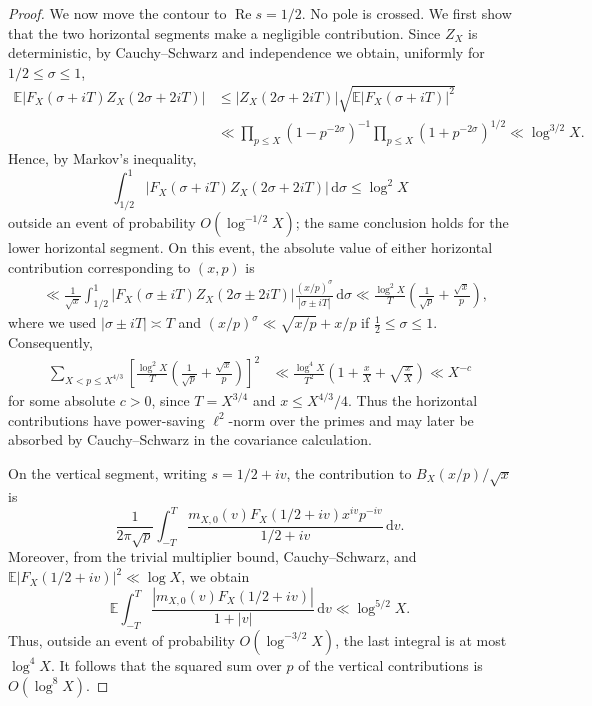 \documentclass[a4paper,12pt,reqno]{amsart}
\numberwithin{equation}{section}
\theoremstyle{remark}
\newcommand{\E}{\mathbb{E}}
\begin{document}
\begin{proof}

We now move the contour to $\operatorname{Re}s=1/2$. No pole is crossed.
We first show that the two horizontal segments make a negligible
contribution. Since $Z_X$ is deterministic, by Cauchy--Schwarz and
independence we obtain, uniformly for $1/2\leq\sigma\leq1$,
\[
 \begin{aligned}
 \E|F_X(\sigma+iT)Z_X(2\sigma+2iT)|
 &\leq |Z_X(2\sigma+2iT)|
 \sqrt{\E|F_X(\sigma+iT)|^2}\\
 &\ll
 \prod_{p\leq X}(1-p^{-2\sigma})^{-1}
 \prod_{p\leq X}(1+p^{-2\sigma})^{1/2}
 \ll \log^{3/2}X.
 \end{aligned}
\]
Hence, by Markov's inequality,
\[
 \int_{1/2}^1
 |F_X(\sigma+iT)Z_X(2\sigma+2iT)|\,\mathrm{d}\sigma
 \leq\log^2X
\]
outside an event of probability $O(\log^{-1/2}X)$; the same conclusion
holds for the lower horizontal segment.
On this event, the absolute value of either horizontal contribution
corresponding to $(x,p)$ is
\[
 \begin{aligned}
 &\ll \frac1{\sqrt x}
 \int_{1/2}^1
 |F_X(\sigma\pm iT)Z_X(2\sigma\pm2iT)|
 \frac{(x/p)^\sigma}{|\sigma\pm iT|}
 \,\mathrm{d}\sigma\ll \frac{\log^2X}{T}
 \left(\frac1{\sqrt p}+\frac{\sqrt x}{p}\right),
 \end{aligned}
\]
where we used $|\sigma\pm iT|\asymp T$ and
\(
 \left({x}/{p}\right)^\sigma
 \ll \sqrt{x/p}+x/p \) if \(\frac12\leq\sigma\leq1.
\)
Consequently,
\[
 \begin{aligned}
 \sum_{X<p\leq X^{4/3}}
 \left[
 \frac{\log^2X}{T}
 \left(\frac1{\sqrt p}+\frac{\sqrt x}{p}\right)
 \right]^2
 &\ll
 \frac{\log^4X}{T^2}
 \left(1+\frac{x}{X}+\sqrt{\frac{x}{X}}\right)\ll X^{-c}
 \end{aligned}
\]
for some absolute $c>0$, since $T=X^{3/4}$ and
$x\leq X^{4/3}/4$. Thus the horizontal contributions have
power-saving $\ell^2$-norm over the primes and may later be absorbed by
Cauchy--Schwarz in the covariance calculation.

On the vertical segment, writing $s=1/2+iv$, the contribution to
$B_X(x/p)/\sqrt x$ is
\[
 \frac1{2\pi\sqrt p}
 \int_{-T}^{T}
 \frac{m_{X,0}(v)F_X(1/2+iv)x^{iv}p^{-iv}}
 {1/2+iv}\,\mathrm{d}v.
\]
Moreover, from the trivial multiplier bound, Cauchy--Schwarz, and
$\E|F_X(1/2+iv)|^2\ll\log X$, we obtain
\[
 \E\int_{-T}^{T}
 \frac{|m_{X,0}(v)F_X(1/2+iv)|}{1+|v|}\,\mathrm{d}v
 \ll\log^{5/2}X.
\]
Thus, outside an event of probability $O(\log^{-3/2}X)$, the last integral
is at most $\log^4X$. It follows that the squared sum over $p$ of the
vertical contributions is $O(\log^8X)$.


\end{proof}
\end{document}
